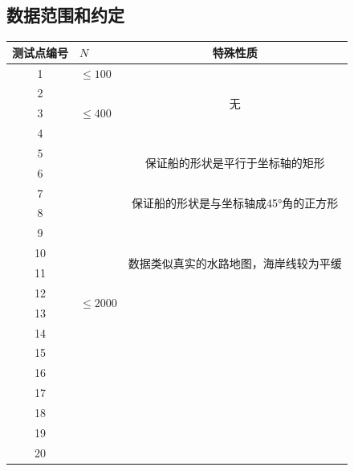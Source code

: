 \documentclass[12pt, a4paper]{article}
\begin{document}
\subsection{数据范围和约定}
\begin{tabular}{|c|p{40pt}<{\centering}|c|}
	\hline
	测试点编号 & $N$ & 特殊性质\\
	\hline
	1 & $\leq 100$ & \multirow{4}{*}{无} \\
	\cline{1-2}
	2 & \multirow{3}{*}{$\leq 400$}& \\
	\cline{1-1}
	3 & & \\
	\cline{1-1}
	4 & & \\
	\cline{1-3}
	5 & \multirow{16}{*}{$\leq 2000$}& \multirow{2}{*}{保证船的形状是平行于坐标轴的矩形} \\
	\cline{1-1}
	6 & & \\
	\cline{1-1}\cline{3-3}
	7 & & \multirow{2}{*}{保证船的形状是与坐标轴成45°角的正方形} \\
	\cline{1-1}
    8 & & \\
    \cline{1-1}\cline{3-3}
    9 & & \multirow{4}{*}{数据类似真实的水路地图，海岸线较为平缓}\\
    \cline{1-1}
    10 & & \\
    \cline{1-1}
    11 & & \\
    \cline{1-1}
	12 & & \\
	\cline{1-1}\cline{3-3}
	13 & & \\
	\cline{1-1}
	14 & & \\
	\cline{1-1}
	15 & & \\
	\cline{1-1}
	16 & & \\
	\cline{1-1}
	17 & & \\
	\cline{1-1}
	18 & & \\
	\cline{1-1}
	19 & & \\
	\cline{1-1}
	20 & & \\
    \hline
\end{tabular}
\end{document}
